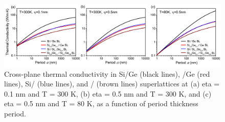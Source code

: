 \begin{figure}[hbt]
  \centering \includegraphics[width=1.0\textwidth]{figures/ch6/Fig4.jpg}
  \caption{Cross-plane thermal conductivity in Si/Ge (black lines), /Ge (red lines), Si/ (blue lines), and / (brown lines) superlattices at (a) \gls{eta} = 0.1 nm and \gls{T} = 300 K, (b) \gls{eta} = 0.5 nm and \gls{T} = 300 K, and (c) \gls{eta} = 0.5 nm and \gls{T} = 80 K, as a function of period thickness \gls{period}.}
  \label{fig:ch6-4}
\end{figure}

